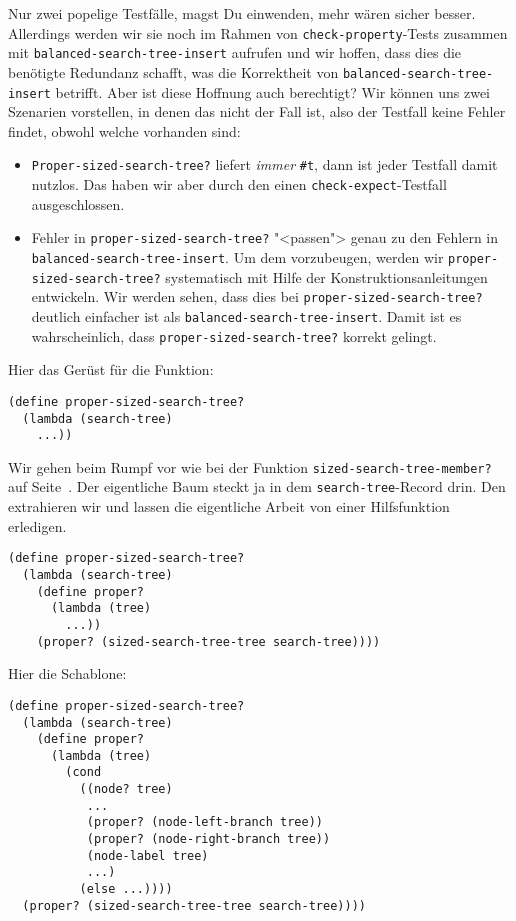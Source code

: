%
Nur zwei popelige Testfälle, magst Du einwenden, mehr wären sicher
besser.  Allerdings werden wir sie noch im Rahmen von
\lstinline{check-property}-Tests zusammen mit
\lstinline{balanced-search-tree-insert} aufrufen und wir hoffen, dass
dies die benötigte Redundanz schafft, was die Korrektheit von
\lstinline{balanced-search-tree-insert} betrifft.  Aber ist diese
Hoffnung auch berechtigt?  Wir können uns zwei Szenarien vorstellen,
in denen das nicht der Fall ist, also der Testfall keine Fehler
findet, obwohl welche vorhanden sind:
%
\begin{itemize}
\item \lstinline{Proper-sized-search-tree?} liefert \emph{immer}
  \lstinline{#t}, dann ist jeder Testfall damit nutzlos.  Das haben
  wir aber durch den einen \lstinline{check-expect}-Testfall
  ausgeschlossen.
\item Fehler in \lstinline{proper-sized-search-tree?} "<passen"> genau
  zu den Fehlern in \lstinline{balanced-search-tree-insert}.  Um dem
  vorzubeugen, werden wir \lstinline{proper-sized-search-tree?}
  systematisch mit Hilfe der Konstruktionsanleitungen entwickeln.
  Wir werden sehen, dass dies bei
  \lstinline{proper-sized-search-tree?} deutlich einfacher ist als
  \lstinline{balanced-search-tree-insert}.  
  Damit ist es wahrscheinlich, dass
  \lstinline{proper-sized-search-tree?} korrekt gelingt.
\end{itemize}
%
Hier das Gerüst für die Funktion:
%
\begin{lstlisting}
(define proper-sized-search-tree?
  (lambda (search-tree)
    ...))
\end{lstlisting}
%
Wir gehen beim Rumpf vor wie bei der Funktion
\lstinline{sized-search-tree-member?} auf
Seite~\pageref{func:sized-search-tree-member}. Der eigentliche Baum
steckt ja in dem \lstinline{search-tree}-Record drin.  Den extrahieren
wir und lassen die eigentliche Arbeit von einer Hilfsfunktion erledigen.
%
\begin{lstlisting}
(define proper-sized-search-tree?
  (lambda (search-tree)
    (define proper?
      (lambda (tree)
        ...))
    (proper? (sized-search-tree-tree search-tree))))
\end{lstlisting}
%
Hier die Schablone:
%
\begin{lstlisting}
(define proper-sized-search-tree?
  (lambda (search-tree)
    (define proper?
      (lambda (tree)
        (cond
          ((node? tree)
           ...
           (proper? (node-left-branch tree))
           (proper? (node-right-branch tree))
           (node-label tree)
           ...)
          (else ...))))
  (proper? (sized-search-tree-tree search-tree))))
\end{lstlisting}
